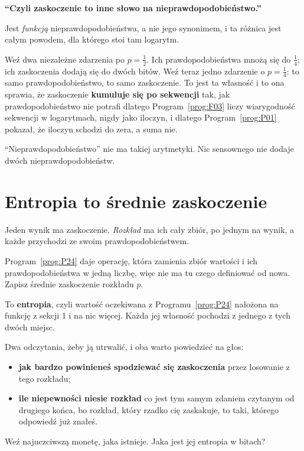 \begin{fr}
\begin{trapbox}
\textbf{\enquote{Czyli zaskoczenie to inne słowo na nieprawdopodobieństwo.}}

Jest \emph{funkcją} nieprawdopodobieństwa, a nie jego synonimem, i ta różnica
jest całym powodem, dla którego stoi tam logarytm.

Weź dwa niezależne zdarzenia po $p = \frac{1}{2}$. Ich prawdopodobieństwa
mnożą się do $\frac{1}{4}$; ich zaskoczenia dodają się do dwóch bitów. Weź
teraz jedno zdarzenie o $p = \frac{1}{4}$: to samo prawdopodobieństwo, to samo
zaskoczenie. To jest ta własność i to ona sprawia, że zaskoczenie
\textbf{kumuluje się po sekwencji} tak, jak prawdopodobieństwo nie potrafi
\dash{} dlatego Program~\ref{prog:F03} liczy wiarygodność sekwencji w
logarytmach, nigdy jako iloczyn, i dlatego Program~\ref{prog:P01} pokazał, że
iloczyn schodzi do zera, a suma nie.

\enquote{Nieprawdopodobieństwo} nie ma takiej arytmetyki. Nic sensownego nie
dodaje dwóch nieprawdopodobieństw.
\end{trapbox}
\end{fr}

\section{Entropia to średnie zaskoczenie}
\label{sec:P29-entropy}

\begin{fr}
Jeden wynik ma zaskoczenie. \emph{Rozkład} ma ich cały zbiór, po jednym na
wynik, a każde przychodzi ze swoim prawdopodobieństwem.

Program~\ref{prog:P24} daje operację, która zamienia zbiór wartości i ich
prawdopodobieństwa w jedną liczbę, więc nie ma tu czego definiować od nowa.
Zapisz średnie zaskoczenie rozkładu $p$.
\dotline
\nextframe
\end{fr}

\begin{fr}

To \textbf{entropia}, czyli wartość oczekiwana z Programu~\ref{prog:P24}
nałożona na funkcję z sekcji 1 i na nic więcej. Każda jej własność pochodzi z
jednego z tych dwóch miejsc.

Dwa odczytania, żeby ją utrwalić, i oba warto powiedzieć na głos:

\begin{itemize}
\item \textbf{jak bardzo powinieneś spodziewać się zaskoczenia} przez
  losowanie z tego rozkładu;
\item \textbf{ile niepewności niesie rozkład} \dash{} co jest tym samym
  zdaniem czytanym od drugiego końca, bo rozkład, który rzadko cię zaskakuje,
  to taki, którego odpowiedź już znałeś.
\end{itemize}

Weź najuczciwszą monetę, jaka istnieje. Jaka jest jej entropia w bitach?
\dotline
\nextframe
\end{fr}

